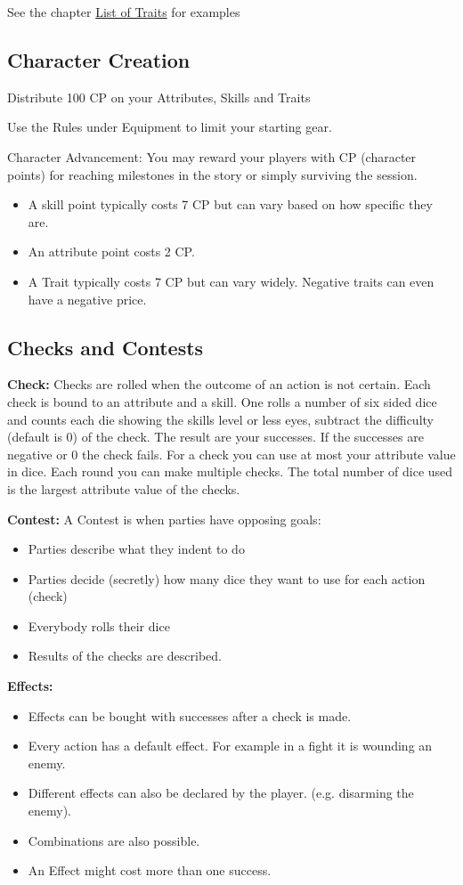 \documentclass[11pt]{article}
\begin{document}
{\begin{multicols}{2}[]
See the chapter \hyperref[sec:orgca3015e]{List of Traits} for examples

\subsection{Character Creation}
\label{sec:orgc9e55d2}
Distribute 100 CP on your Attributes, Skills and Traits

Use the Rules under Equipment to limit your starting gear.

Character Advancement:
You may reward your players with CP (character points) for reaching milestones in the story or simply surviving the session.

\begin{itemize}
\item A skill point typically costs 7 CP but can vary based on how specific they are.
\item An attribute point costs 2 CP.
\item A Trait typically costs 7 CP but can vary widely. Negative traits can even have a negative price.
\end{itemize}

\subsection{Checks and Contests}
\label{sec:orgad1fc8e}
\textbf{Check:}
Checks are rolled when the outcome of an action is not certain. Each check is bound to an attribute and a skill. One rolls a number of six sided dice and counts each die showing the skills level or less eyes, subtract the difficulty (default is 0) of the check. The result are your successes. If the successes are negative or 0 the check fails. For a check you can use at most your attribute value in dice.
Each round you can make multiple checks. The total number of dice used is the largest attribute value of the checks. 

\textbf{Contest:}
A Contest is when parties have opposing goals:
\begin{itemize}
\item Parties describe what they indent to do
\item Parties decide (secretly) how many dice they want to use for each action (check)
\item Everybody rolls their dice
\item Results of the checks are described.
\end{itemize}

\textbf{Effects:}
\begin{itemize}
\item Effects can be bought with successes after a check is made.
\item Every action has a default effect. For example in a fight it is wounding an enemy.
\item Different effects can also be declared by the player. (e.g. disarming the enemy).
\item Combinations are also possible.
\item An Effect might cost more than one success.
\end{itemize}


\end{multicols}}
\end{document}
